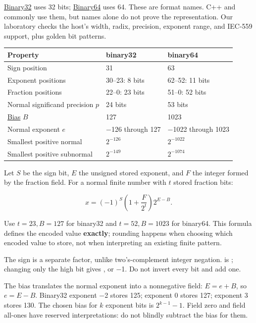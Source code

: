 \hypertarget{01-foundations-i-ch001-the-two-formats-and-their-interpretation}{}

\hyperref[appendix-5057f9ad327f]{Binary32} uses 32 bits; \hyperref[appendix-5078dfab64e6]{Binary64} uses 64. These are format names. C++  and  commonly use them, but names alone do not prove the representation. Our laboratory checks the host's width, radix, precision, exponent range, and IEC-559 support, plus golden bit patterns.

{\def\LTcaptype{none} %
\begin{longtable}[]{@{}lll@{}}
\toprule\noalign{}
Property & binary32 & binary64 \\
\midrule\noalign{}
\endhead
\bottomrule\noalign{}
\endlastfoot
Sign position & 31 & 63 \\
Exponent positions & 30--23: 8 bits & 62--52: 11 bits \\
Fraction positions & 22--0: 23 bits & 51--0: 52 bits \\
Normal significand precision \(p\) & 24 bits & 53 bits \\
\hyperref[appendix-2fae058c82e1]{Bias} \(B\) & 127 & 1023 \\
Normal exponent \(e\) & −126 through 127 & −1022 through 1023 \\
Smallest positive normal & \(2^{-126}\) & \(2^{-1022}\) \\
Smallest positive subnormal & \(2^{-149}\) & \(2^{-1074}\) \\
\end{longtable}
}

Let \(S\) be the sign bit, \(E\) the unsigned stored exponent, and \(F\) the integer formed by the fraction field. For a normal finite number with \(t\) stored fraction bits:

\[
x=(-1)^S\left(1+\frac{F}{2^t}\right)2^{E-B}.
\]

Use \(t=23,B=127\) for binary32 and \(t=52,B=1023\) for binary64. This formula defines the encoded value \textbf{exactly}; rounding happens when choosing which encoded value to store, not when interpreting an existing finite pattern.

The sign is a separate factor, unlike two's-complement integer negation.  is ; changing only the high bit gives , or −1. Do not invert every bit and add one.

The bias translates the normal exponent into a nonnegative field: \(E=e+B\), so \(e=E-B\). Binary32 exponent −2 stores 125; exponent 0 stores 127; exponent 3 stores 130. The chosen bias for \(k\) exponent bits is \(2^{k-1}-1\). Field zero and field all-ones have reserved interpretations: do not blindly subtract the bias for them.

